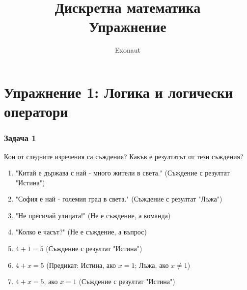 \documentclass[fleqn, 12pt]{article}
\title{Дискретна математика \\ Упражнение}
\author{Exonaut}
\theoremstyle{definition}
\begin{document}
\maketitle
{}

\newpage
{}

\tableofcontents
\newpage

\section{Упражнение 1: Логика и логически оператори}

\subsubsection*{Задача 1}
Кои от следните изречения са съждения? Какъв е резултатът от тези съждения?
\begin{enumerate}
\item "Китай е държава с най - много жители в света." (Съждение с резултат "Истина")
\item "София е най - големия град в света." (Съждение с резултат "Лъжа")
\item "Не пресичай улицата!" (Не е съждение, а команда)
\item "Колко е часът?" (Не е съждение, а въпрос)
\item $4 + 1 = 5$ (Съждение с резултат "Истина")
\item $4 + x = 5$ (Предикат: Истина, ако $x = 1$; Лъжа, ако $x \neq 1$)
\item $4 + x = 5$, ако $x = 1$ (Съждение с резултат "Истина")
\end{enumerate}
\end{document}
